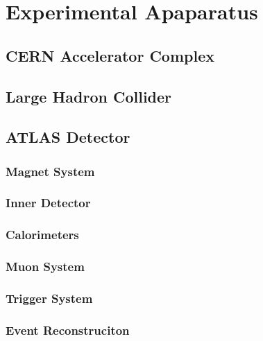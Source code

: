 \chapter{Experimental Apaparatus} 

\section{CERN Accelerator Complex}
\section{Large Hadron Collider}

\section{ATLAS Detector}
\subsection{Magnet System}
\subsection{Inner Detector}
\subsection{Calorimeters}
\subsection{Muon System}
\subsection{Trigger System}
\subsection{Event Reconstruciton}

